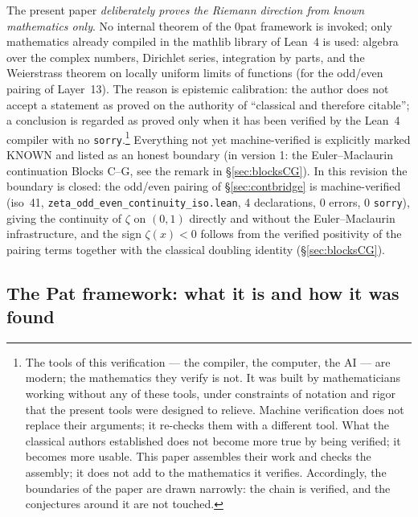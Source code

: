 \documentclass{article}
\newcommand{\zt}{\zeta}
\begin{document}
The present paper \emph{deliberately proves the Riemann direction from known
mathematics only}. No internal theorem of the 0pat framework is invoked;
only mathematics already compiled in the mathlib library of Lean~4 is used:
algebra over the complex numbers, Dirichlet series, integration by parts,
and the Weierstrass theorem on locally uniform limits of functions (for the
odd/even pairing of Layer~13). The reason is epistemic calibration: the author does
not accept a statement as proved on the authority of ``classical and
therefore citable''; a conclusion is regarded as proved only when it has been
verified by the Lean~4 compiler with no \texttt{sorry}.\footnote{The
tools of this verification --- the compiler, the computer, the AI ---
are modern; the mathematics they verify is not. It was built by
mathematicians working without any of these tools, under constraints of
notation and rigor that the present tools were designed to relieve.
Machine verification does not replace their arguments; it re-checks
them with a different tool. What the classical authors established does
not become more true by being verified; it becomes more usable. This
paper assembles their work and checks the assembly; it does not add to
the mathematics it verifies. Accordingly, the boundaries of the paper
are drawn narrowly: the chain is verified, and the conjectures around
it are not touched.} Everything not yet
machine-verified is explicitly marked KNOWN and listed as an honest boundary
(in version 1: the Euler--Maclaurin continuation Blocks C--G, see the
remark in \S\ref{sec:blocksCG}). In this revision the boundary is closed: the odd/even
pairing of \S\ref{sec:contbridge} is machine-verified (iso~41,
\texttt{zeta\_odd\_even\_continuity\_iso.lean}, 4 declarations, 0 errors,
0 \texttt{sorry}), giving the continuity of $\zt$ on $(0,1)$ directly and
without the Euler--Maclaurin infrastructure, and the sign $\zt(x)<0$ follows
from the verified positivity of the pairing terms together with the
classical doubling identity (\S\ref{sec:blocksCG}).

\subsection{The Pat framework: what it is and how it was found}
\label{sec:pat}
\end{document}
